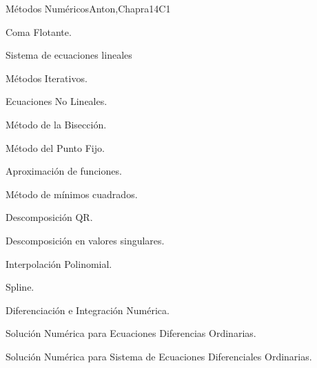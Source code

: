 \begin{syllabus}
 \begin{unit}{Métodos Numéricos}{}{Anton,Chapra}{14}{C1}
    \begin{topics}
     \item Coma Flotante.
     \item Sistema de ecuaciones lineales
       \begin{subtopics}
         \item Métodos Iterativos.
       \end{subtopics}
     \item Ecuaciones No Lineales.
       \begin{subtopics}
         \item Método de la Bisección.
         \item Método del Punto Fijo.
       \end{subtopics}
     \item Aproximación de funciones.
       \begin{subtopics}
         \item Método de mínimos cuadrados.
         \item Descomposición QR.
         \item Descomposición en valores singulares.
       \end{subtopics}
     \item Interpolación Polinomial.
     \item Spline.
     \item Diferenciación e Integración Numérica.
     \item Solución Numérica para Ecuaciones Diferencias Ordinarias.
     \item Solución Numérica para Sistema de Ecuaciones Diferenciales Ordinarias.
     \end{topics}
 

\end{unit}
\end{syllabus}
